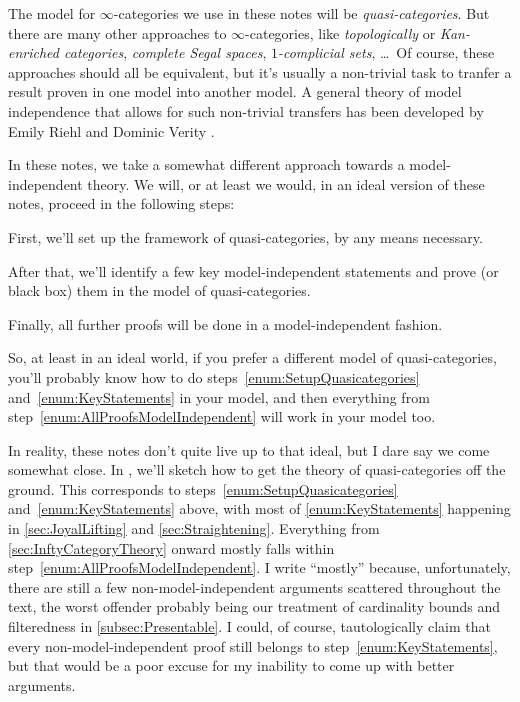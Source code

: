 \documentclass[DIV=12,numbers=enddot,leqno,bibliography=totoc]{scrartcl}
\theoremstyle{csatanicthm}
\begin{document}
	\begin{numpar}\label{par:ModelIndependenceIntro}
		The model for $\infty$-categories we use in these notes will be \emph{quasi-categories}. But there are many other approaches to $\infty$-categories, like \emph{topologically} or \emph{Kan-enriched categories}, \emph{complete Segal spaces}, \emph{$1$-complicial sets}, \ldots\ Of course, these approaches should all be equivalent, but it's usually a non-trivial task to tranfer a result proven in one model into another model. A general theory of model independence that allows for such non-trivial transfers has been developed by Emily Riehl and Dominic Verity \cite{RiehlVerity}.
		
		In these notes, we take a somewhat different approach towards a model-independent theory. We will, or at least we would, in an ideal version of these notes, proceed in the following steps:
		\begin{alphanumerate}
			\item First, we'll set up the framework of quasi-categories, by any means necessary.\label{enum:SetupQuasicategories}
			\item After that, we'll identify a few key model-independent statements and prove (or black box) them in the model of quasi-categories.\label{enum:KeyStatements}
			\item Finally, all further proofs will be done in a model-independent fashion.\label{enum:AllProofsModelIndependent}
		\end{alphanumerate}
		So, at least in an ideal world, if you prefer a different model of quasi-categories, you'll probably know how to do steps~\cref{enum:SetupQuasicategories} and~\cref{enum:KeyStatements} in your model, and then everything from step~\cref{enum:AllProofsModelIndependent} will work in your model too.
		
		In reality, these notes don't quite live up to that ideal, but I dare say we come somewhat close. In , we'll sketch how to get the theory of quasi-categories off the ground. This corresponds to steps~\cref{enum:SetupQuasicategories} and~\cref{enum:KeyStatements} above, with most of \cref{enum:KeyStatements} happening in \cref{sec:JoyalLifting} and \cref{sec:Straightening}. Everything from \cref{sec:InftyCategoryTheory} onward mostly falls within step~\cref{enum:AllProofsModelIndependent}. I write \enquote{mostly} because, unfortunately, there are still a few non-model-independent arguments scattered throughout the text, the worst offender probably being our treatment of cardinality bounds and filteredness in \cref{subsec:Presentable}. I could, of course, tautologically claim that every non-model-independent proof still belongs to step~\cref{enum:KeyStatements}, but that would be a poor excuse for my inability to come up with better arguments.
		

\end{numpar}
\end{document}
